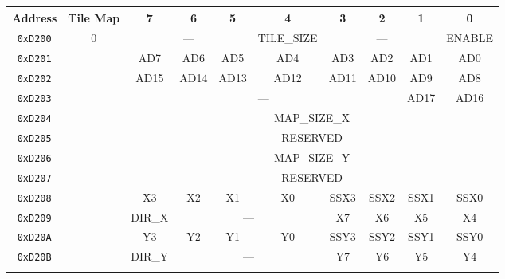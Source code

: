 \begin{table}[h]
    \begin{center}
        \begin{tabular}{|c|c|c|c|c|c|c|c|c|c|} \hline
            Address & Tile Map & 7 & 6 & 5 & 4 & 3 & 2 & 1 & 0 \\ \hline
            \verb+0xD200+ & \multirow{11}{*}{0} & \multicolumn{3}{|c|}{---} & TILE\_SIZE & \multicolumn{3}{|c|}{---} & ENABLE \\ \hline
            \verb+0xD201+ & & AD7 & AD6 & AD5 & AD4 & AD3 & AD2 & AD1 & AD0 \\ \hline
            \verb+0xD202+ & & AD15 & AD14 & AD13 & AD12 & AD11 & AD10 & AD9 & AD8 \\ \hline
            \verb+0xD203+ & & \multicolumn{6}{|c|}{---} & AD17 & AD16 \\ \hline
            \verb+0xD204+ & & \multicolumn{8}{|c|}{MAP\_SIZE\_X} \\ \hline
            \verb+0xD205+ & & \multicolumn{8}{|c|}{RESERVED} \\ \hline
            \verb+0xD206+ & & \multicolumn{8}{|c|}{MAP\_SIZE\_Y} \\ \hline
            \verb+0xD207+ & & \multicolumn{8}{|c|}{RESERVED} \\ \hline
            \verb+0xD208+ & & X3 & X2 & X1 & X0 & SSX3 & SSX2 & SSX1 & SSX0 \\ \hline
            \verb+0xD209+ & & DIR\_X & \multicolumn{3}{|c|}{---} & X7 & X6 & X5 & X4 \\ \hline
            \verb+0xD20A+ & & Y3 & Y2 & Y1 & Y0 & SSY3 & SSY2 & SSY1 & SSY0 \\ \hline
            \verb+0xD20B+ & & DIR\_Y &\multicolumn{3}{|c|}{---} & Y7 & Y6 & Y5 & Y4 \\ \hline \\


\end{tabular}
\end{center}
\end{table}
